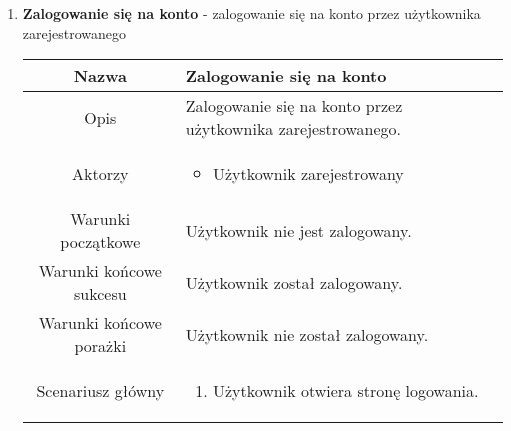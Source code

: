 \documentclass{article}
\begin{document}
\begin{enumerate}
\begin{enumerate}
			\item \textbf{Zalogowanie się na konto} - zalogowanie się na konto przez
				użytkownika zarejestrowanego
				\begin{table}[H]
					\centering
					\begin{tabular}{|c|p{7cm}|}
						\hline
						Nazwa                   & Zalogowanie się na konto                                                                                                                                                                                                                                                                                \\
						\hline
						Opis                    & Zalogowanie się na konto przez użytkownika zarejestrowanego.                                                                                                                                                                                                                                            \\
						\hline
						Aktorzy                 & \begin{itemize}\item Użytkownik zarejestrowany\end{itemize}                                                                                                                                                                                                                                             \\
						\hline
						Warunki początkowe      & Użytkownik nie jest zalogowany.                                                                                                                                                                                                                                                                         \\
						\hline
						Warunki końcowe sukcesu & Użytkownik został zalogowany.                                                                                                                                                                                                                                                                           \\
						\hline
						Warunki końcowe porażki & Użytkownik nie został zalogowany.                                                                                                                                                                                                                                                                       \\
						\hline
						Scenariusz główny       & \begin{enumerate}\item Użytkownik otwiera stronę logowania.


\end{enumerate}
\end{tabular}
\end{table}
\end{enumerate}
\end{enumerate}
\end{document}
